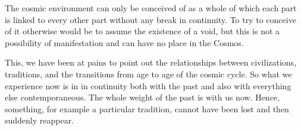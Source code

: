 \begin{quotex}
The cosmic environment can only be conceived of as a whole of which each part is linked to every other part without any break in continuity. To try to conceive of it otherwise would be to assume the existence of a void, but this is not a possibility of manifestation and can have no place in the Cosmos. 

\end{quotex}
This, we have been at pains to point out the relationships between civilizations, traditions, and the transitions from age to age of the cosmic cycle. So what we experience now is in in continuity both with the past and also with everything else contemporaneous. The whole weight of the past is with us now. Hence, something, for example a particular tradition, cannot have been lost and then suddenly reappear.



